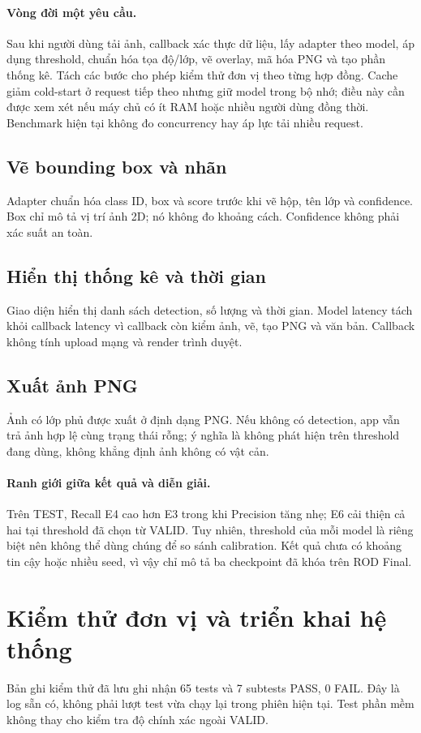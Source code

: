 \documentclass[12pt,a4paper,oneside]{report}
\begin{document}
\paragraph{Vòng đời một yêu cầu.}
Sau khi người dùng tải ảnh, callback xác thực dữ liệu, lấy adapter theo model, áp dụng threshold, chuẩn hóa tọa độ/lớp, vẽ overlay, mã hóa PNG và tạo phần thống kê. Tách các bước cho phép kiểm thử đơn vị theo từng hợp đồng. Cache giảm cold-start ở request tiếp theo nhưng giữ model trong bộ nhớ; điều này cần được xem xét nếu máy chủ có ít RAM hoặc nhiều người dùng đồng thời. Benchmark hiện tại không đo concurrency hay áp lực tải nhiều request.

\subsection{Vẽ bounding box và nhãn}
Adapter chuẩn hóa class ID, box và score trước khi vẽ hộp, tên lớp và confidence. Box chỉ mô tả vị trí ảnh 2D; nó không đo khoảng cách. Confidence không phải xác suất an toàn.
\subsection{Hiển thị thống kê và thời gian}
Giao diện hiển thị danh sách detection, số lượng và thời gian. Model latency tách khỏi callback latency vì callback còn kiểm ảnh, vẽ, tạo PNG và văn bản. Callback không tính upload mạng và render trình duyệt.
\subsection{Xuất ảnh PNG}
Ảnh có lớp phủ được xuất ở định dạng PNG. Nếu không có detection, app vẫn trả ảnh hợp lệ cùng trạng thái rỗng; ý nghĩa là không phát hiện trên threshold đang dùng, không khẳng định ảnh không có vật cản.
\paragraph{Ranh giới giữa kết quả và diễn giải.}
Trên TEST, Recall E4 cao hơn E3 trong khi Precision tăng nhẹ; E6 cải thiện cả hai tại threshold đã chọn từ VALID. Tuy nhiên, threshold của mỗi model là riêng biệt nên không thể dùng chúng để so sánh calibration. Kết quả chưa có khoảng tin cậy hoặc nhiều seed, vì vậy chỉ mô tả ba checkpoint đã khóa trên ROD Final.

\section{Kiểm thử đơn vị và triển khai hệ thống}
Bản ghi kiểm thử đã lưu ghi nhận 65 tests và 7 subtests PASS, 0 FAIL. Đây là log sẵn có, không phải lượt test vừa chạy lại trong phiên hiện tại. Test phần mềm không thay cho kiểm tra độ chính xác ngoài VALID.
\end{document}
